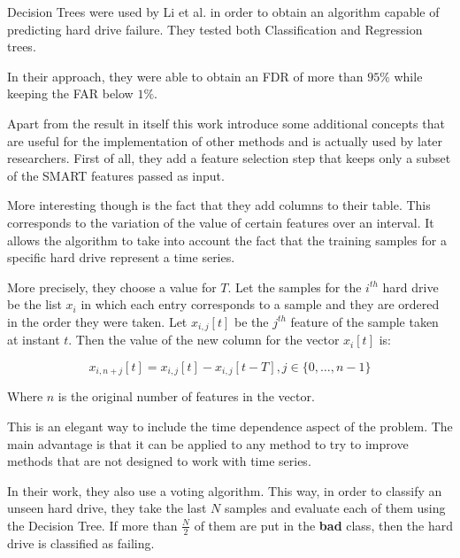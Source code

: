 


Decision Trees were used by Li et al. \cite{Li14} in order to obtain an algorithm capable of predicting hard drive failure.
They tested both Classification and Regression trees.

In their approach, they were able to obtain an FDR of more than $95\%$ while keeping the FAR below $1\%$.

Apart from the result in itself this work introduce some additional concepts that are useful for the implementation of other methods and is actually used by later researchers.
First of all, they add a feature selection step that keeps only a subset of the SMART features passed as input.

More interesting though is the fact that they add columns to their table.
This corresponds to the variation of the value of certain features over an interval.
It allows the algorithm to take into account the fact that the training samples for a specific hard drive represent a time series.

More precisely, they choose a value for $T$.
Let the samples for the $i^{th}$ hard drive be the list $x_i$ in which each entry corresponds to a sample and they are ordered in the order they were taken.
Let $x_{i,j}[t]$ be the $j^{th}$ feature of the sample taken at instant $t$.
Then the value of the new column for the vector $x_i[t]$ is:

$$x_{i,n+j}[t] = x_{i,j}[t] - x_{i,j}[t-T], j \in \{0,\dots,n-1\}$$

Where $n$ is the original number of features in the vector.

This is an elegant way to include the time dependence aspect of the problem.
The main advantage is that it can be applied to any method to try to improve methods that are not designed to work with time series.

In their work, they also use a voting algorithm.
This way, in order to classify an unseen hard drive, they take the last $N$ samples and evaluate each of them using the Decision Tree.
If more than $\frac{N}{2}$ of them are put in the \textbf{bad} class, then the hard drive is classified as failing.

